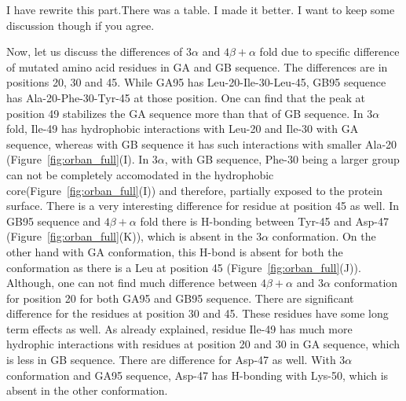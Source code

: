 \documentclass[12pt]{article}
\newcommand{\Arijit}[1]{\color{yellow}#1\normalcolor}
\begin{document}
\Arijit{I have rewrite this part.There was a table. I made it better. I want to keep some discussion though if you agree.}

 
Now, let us discuss the differences of $3 \alpha$ and $4 \beta + \alpha$ fold due to specific difference of mutated amino acid 
residues in GA and GB sequence. The differences are in positions 20, 30 and 45. While GA95 has Leu-20-Ile-30-Leu-45, GB95 sequence 
has Ala-20-Phe-30-Tyr-45 at those position. One can find that the peak at position 49 stabilizes the GA sequence more than that of GB
sequence. In $3 \alpha$ fold, Ile-49 has hydrophobic interactions with Leu-20 and Ile-30 with GA sequence, whereas with GB sequence it 
has such interactions with smaller Ala-20 (Figure~\ref{fig:orban_full}(I). In $3 \alpha$, with GB sequence, Phe-30 
being a larger group can not be completely accomodated in the hydrophobic core(Figure~\ref{fig:orban_full}(I)) and therefore, 
partially exposed to the protein surface. There is a very interesting difference for residue at position 45 as well. In GB95 sequence
and $4 \beta + \alpha$ fold there is H-bonding between Tyr-45 and Asp-47 (Figure~\ref{fig:orban_full}(K)), which is absent in the
$3 \alpha$ conformation. On the other hand with GA conformation, this H-bond is absent for both the conformation as there is a Leu at position
45 (Figure~\ref{fig:orban_full}(J)). Although, one can not find much difference between $4 \beta + \alpha$ and $3 \alpha$ conformation
for position 20 for both GA95 and GB95 sequence. There are significant difference for the residues at position 30 and 45.  
These residues have some long term effects as well. As already explained, residue Ile-49 has much more hydrophic interactions with residues
at position 20 and 30 in GA sequence, which is less in GB sequence. There are difference for Asp-47 as well. With $3 \alpha$ conformation 
and GA95 sequence, Asp-47 has H-bonding with Lys-50, which is absent in the other conformation.    
      
\end{document}
